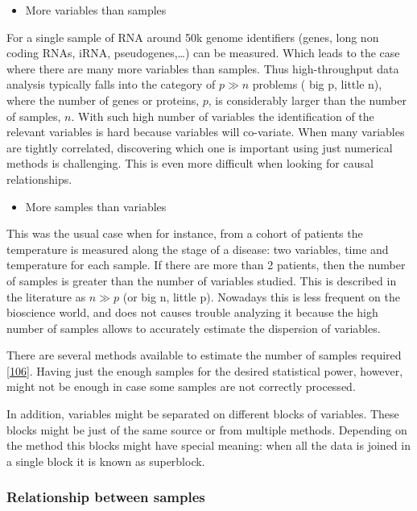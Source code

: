 \documentclass[
  a4paper,
]{book}
\providecommand{\tightlist}{%
  \setlength{\itemsep}{0pt}\setlength{\parskip}{0pt}}
\begin{document}
\begin{itemize}
\tightlist
\item
  More variables than samples
\end{itemize}

For a single sample of RNA around 50k genome identifiers (genes, long non coding RNAs, iRNA, pseudogenes,\ldots) can be measured.
Which leads to the case where there are many more variables than samples.
Thus high-throughput data analysis typically falls into the category of \(p \gg n\) problems ( big p, little n), where the number of genes or proteins, \(p\), is considerably larger than the number of samples, \(n\).
With such high number of variables the identification of the relevant variables is hard because variables will co-variate.
When many variables are tightly correlated, discovering which one is important using just numerical methods is challenging.
This is even more difficult when looking for causal relationships.

\begin{itemize}
\tightlist
\item
  More samples than variables
\end{itemize}

This was the usual case when for instance, from a cohort of patients the temperature is measured along the stage of a disease: two variables, time and temperature for each sample.
If there are more than 2 patients, then the number of samples is greater than the number of variables studied.
This is described in the literature as \(n \gg p\) (or big n, little p).
Nowadays this is less frequent on the bioscience world, and does not causes trouble analyzing it because the high number of samples allows to accurately estimate the dispersion of variables.

There are several methods available to estimate the number of samples required {[}\protect\hyperlink{ref-tarazona2020}{106}{]}.
Having just the enough samples for the desired statistical power, however, might not be enough in case some samples are not correctly processed.

In addition, variables might be separated on different blocks of variables.
These blocks might be just of the same source or from multiple methods.
Depending on the method this blocks might have special meaning: when all the data is joined in a single block it is known as superblock.

\hypertarget{relationship-between-samples}{%
\subsubsection{Relationship between samples}\label{relationship-between-samples}}
\end{document}
